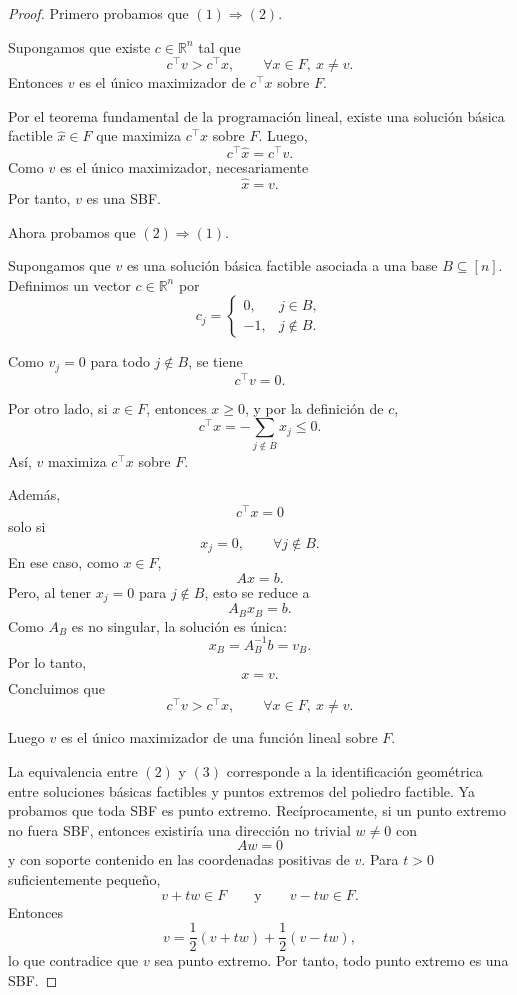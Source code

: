 \begin{proof}
Primero probamos que \((1)\Rightarrow(2)\).

Supongamos que existe \(c\in\mathbb{R}^n\) tal que
\[
    c^\top v>c^\top x,
    \qquad
    \forall x\in F,\ x\neq v.
\]
Entonces \(v\) es el único maximizador de \(c^\top x\) sobre \(F\).

Por el teorema fundamental de la programación lineal, existe una solución básica factible \(\widehat{x}\in F\) que maximiza \(c^\top x\) sobre \(F\). Luego,
\[
    c^\top \widehat{x}
    =
    c^\top v.
\]
Como \(v\) es el único maximizador, necesariamente
\[
    \widehat{x}=v.
\]
Por tanto, \(v\) es una SBF.

\medskip

Ahora probamos que \((2)\Rightarrow(1)\).

Supongamos que \(v\) es una solución básica factible asociada a una base \(B\subseteq[n]\). Definimos un vector \(c\in\mathbb{R}^n\) por
\[
    c_j=
    \begin{cases}
        0, & j\in B,\\
        -1, & j\notin B.
    \end{cases}
\]

Como \(v_j=0\) para todo \(j\notin B\), se tiene
\[
    c^\top v=0.
\]

Por otro lado, si \(x\in F\), entonces \(x\geq 0\), y por la definición de \(c\),
\[
    c^\top x
    =
    -\sum_{j\notin B}x_j
    \leq 0.
\]
Así, \(v\) maximiza \(c^\top x\) sobre \(F\).

Además,
\[
    c^\top x=0
\]
solo si
\[
    x_j=0,
    \qquad
    \forall j\notin B.
\]
En ese caso, como \(x\in F\),
\[
    Ax=b.
\]
Pero, al tener \(x_j=0\) para \(j\notin B\), esto se reduce a
\[
    A_Bx_B=b.
\]
Como \(A_B\) es no singular, la solución es única:
\[
    x_B=A_B^{-1}b=v_B.
\]
Por lo tanto,
\[
    x=v.
\]
Concluimos que
\[
    c^\top v>c^\top x,
    \qquad
    \forall x\in F,\ x\neq v.
\]

Luego \(v\) es el único maximizador de una función lineal sobre \(F\).

\medskip

La equivalencia entre \((2)\) y \((3)\) corresponde a la identificación geométrica entre soluciones básicas factibles y puntos extremos del poliedro factible. Ya probamos que toda SBF es punto extremo. Recíprocamente, si un punto extremo no fuera SBF, entonces existiría una dirección no trivial \(w\neq 0\) con
\[
    Aw=0
\]
y con soporte contenido en las coordenadas positivas de \(v\). Para \(t>0\) suficientemente pequeño,
\[
    v+tw\in F
    \qquad\text{y}\qquad
    v-tw\in F.
\]
Entonces
\[
    v
    =
    \frac{1}{2}(v+tw)
    +
    \frac{1}{2}(v-tw),
\]
lo que contradice que \(v\) sea punto extremo. Por tanto, todo punto extremo es una SBF.
\end{proof}

